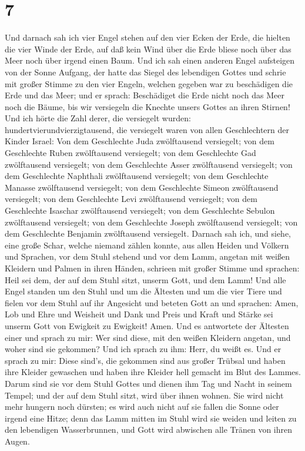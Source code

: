 \hypertarget{section-6}{%
\section{7}\label{section-6}}

 Und darnach sah ich vier Engel stehen auf den vier Ecken
der Erde, die hielten die vier Winde der Erde, auf daß kein Wind über
die Erde bliese noch über das Meer noch über irgend einen Baum.
 Und ich sah einen anderen Engel aufsteigen von der Sonne
Aufgang, der hatte das Siegel des lebendigen Gottes und schrie mit
großer Stimme zu den vier Engeln, welchen gegeben war zu beschädigen die
Erde und das Meer;  und er sprach: Beschädiget die Erde
nicht noch das Meer noch die Bäume, bis wir versiegeln die Knechte
unsers Gottes an ihren Stirnen!  Und ich hörte die Zahl
derer, die versiegelt wurden: hundertvierundvierzigtausend, die
versiegelt waren von allen Geschlechtern der Kinder Israel: 
Von dem Geschlechte Juda zwölftausend versiegelt; von dem Geschlechte
Ruben zwölftausend versiegelt; von dem Geschlechte Gad zwölftausend
versiegelt;  von dem Geschlechte Asser zwölftausend
versiegelt; von dem Geschlechte Naphthali zwölftausend versiegelt; von
dem Geschlechte Manasse zwölftausend versiegelt;  von dem
Geschlechte Simeon zwölftausend versiegelt; von dem Geschlechte Levi
zwölftausend versiegelt; von dem Geschlechte Isaschar zwölftausend
versiegelt;  von dem Geschlechte Sebulon zwölftausend
versiegelt; von dem Geschlechte Joseph zwölftausend versiegelt; von dem
Geschlechte Benjamin zwölftausend versiegelt.  Darnach sah
ich, und siehe, eine große Schar, welche niemand zählen konnte, aus
allen Heiden und Völkern und Sprachen, vor dem Stuhl stehend und vor dem
Lamm, angetan mit weißen Kleidern und Palmen in ihren Händen,
 schrieen mit großer Stimme und sprachen: Heil sei dem, der
auf dem Stuhl sitzt, unserm Gott, und dem Lamm!  Und alle
Engel standen um den Stuhl und um die Ältesten und um die vier Tiere und
fielen vor dem Stuhl auf ihr Angesicht und beteten Gott an 
und sprachen: Amen, Lob und Ehre und Weisheit und Dank und Preis und
Kraft und Stärke sei unserm Gott von Ewigkeit zu Ewigkeit! Amen.
 Und es antwortete der Ältesten einer und sprach zu mir:
Wer sind diese, mit den weißen Kleidern angetan, und woher sind sie
gekommen?  Und ich sprach zu ihm: Herr, du weißt es. Und er
sprach zu mir: Diese sind's, die gekommen sind aus großer Trübsal und
haben ihre Kleider gewaschen und haben ihre Kleider hell gemacht im Blut
des Lammes.  Darum sind sie vor dem Stuhl Gottes und dienen
ihm Tag und Nacht in seinem Tempel; und der auf dem Stuhl sitzt, wird
über ihnen wohnen.  Sie wird nicht mehr hungern noch
dürsten; es wird auch nicht auf sie fallen die Sonne oder irgend eine
Hitze;  denn das Lamm mitten im Stuhl wird sie weiden und
leiten zu den lebendigen Wasserbrunnen, und Gott wird abwischen alle
Tränen von ihren Augen.

